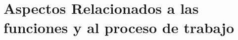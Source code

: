 \section{Aspectos Relacionados a las funciones y al proceso de trabajo}
\label{sec:aspectosRelacionados}